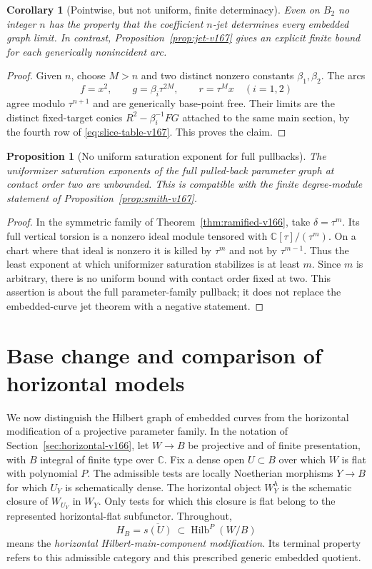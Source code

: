 \documentclass[11pt,reqno]{amsart}
\numberwithin{equation}{section}
\newtheorem{proposition}[theorem]{Proposition}
\newtheorem{corollary}[theorem]{Corollary}
\theoremstyle{definition}\newtheorem{definition}[theorem]{Definition}
\theoremstyle{remark}\newtheorem{remark}[theorem]{Remark}
\newcommand{\C}{\mathbb C}\newcommand{\Q}{\mathbb Q}
\begin{document}
\begin{corollary}[Pointwise, but not uniform, finite determinacy]
\label{cor:no-uniform-v167}
Even on $B_2$ no integer $n$ has the property that the coefficient
$n$-jet determines every embedded graph limit. In contrast,
Proposition~\ref{prop:jet-v167} gives an explicit finite bound for
each generically nonincident arc.
\end{corollary}
\begin{proof}
Given $n$, choose $M>n$ and two distinct nonzero constants
$\beta_1,\beta_2$. The arcs
\[
 f=x^2,\qquad g=\beta_i\tau^{2M},\qquad r=\tau^M x
 \quad(i=1,2)
\]
agree modulo $\tau^{n+1}$ and are generically base-point free.
Their limits are the distinct fixed-target conics
$R^2-\beta_i^{-1}FG$ attached to the same main section, by the
fourth row of \eqref{eq:slice-table-v167}. This proves the claim.
\end{proof}

\begin{proposition}[No uniform saturation exponent for full pullbacks]
\label{prop:no-saturation-bound-v167}
The uniformizer saturation exponents of the full pulled-back
parameter graph at contact order two are unbounded. This is
compatible with the finite degree-module statement of
Proposition~\ref{prop:smith-v167}.
\end{proposition}
\begin{proof}
In the symmetric family of Theorem~\ref{thm:ramified-v166}, take
$\delta=\tau^m$. Its full vertical torsion is a nonzero ideal
module tensored with $\C[\tau]/(\tau^m)$. On a chart where that
ideal is nonzero it is killed by $\tau^m$ and not by
$\tau^{m-1}$. Thus the least exponent at which uniformizer
saturation stabilizes is at least $m$. Since $m$ is arbitrary,
there is no uniform bound with contact order fixed at two.
This assertion is about the full parameter-family pullback; it
does not replace the embedded-curve jet theorem with a negative
statement.
\end{proof}

\section{Base change and comparison of horizontal models}
\label{sec:comparison-v167}
We now distinguish the Hilbert graph of embedded curves from the
horizontal modification of a projective parameter family. In the
notation of Section~\ref{sec:horizontal-v166}, let $W\to B$ be
projective and of finite presentation, with $B$ integral of finite
type over $\C$. Fix a dense open $U\subset B$ over which $W$ is
flat with polynomial $P$. The admissible tests are locally
Noetherian morphisms $Y\to B$ for which $U_Y$ is schematically
dense. The horizontal object $W_Y^h$ is the schematic closure of
$W_{U_Y}$ in $W_Y$. Only tests for which this closure is flat
belong to the represented horizontal-flat subfunctor. Throughout,
\[
 H_B=\overline{s(U)}\ \subset\operatorname{Hilb}^{P}(W/B)
\]
means the \emph{horizontal Hilbert-main-component modification}.
Its terminal property refers to this admissible category and
this prescribed generic embedded quotient.
\end{document}
